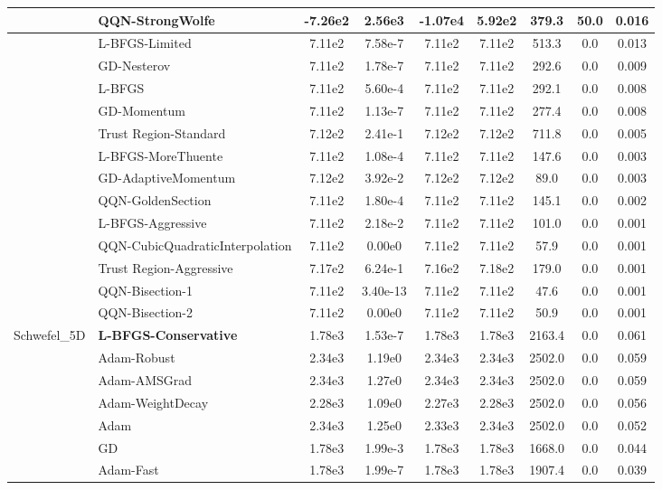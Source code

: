 \documentclass[10pt]{article}
\begin{document}
\begin{longtable}{|l|l|c|c|c|c|c|c|c|}
\hline
 & QQN-StrongWolfe & -7.26e2 & 2.56e3 & -1.07e4 & 5.92e2 & 379.3 & 50.0 & 0.016 \\
\hline
 & L-BFGS-Limited & 7.11e2 & 7.58e-7 & 7.11e2 & 7.11e2 & 513.3 & 0.0 & 0.013 \\
\hline
 & GD-Nesterov & 7.11e2 & 1.78e-7 & 7.11e2 & 7.11e2 & 292.6 & 0.0 & 0.009 \\
\hline
 & L-BFGS & 7.11e2 & 5.60e-4 & 7.11e2 & 7.11e2 & 292.1 & 0.0 & 0.008 \\
\hline
 & GD-Momentum & 7.11e2 & 1.13e-7 & 7.11e2 & 7.11e2 & 277.4 & 0.0 & 0.008 \\
\hline
 & Trust Region-Standard & 7.12e2 & 2.41e-1 & 7.12e2 & 7.12e2 & 711.8 & 0.0 & 0.005 \\
\hline
 & L-BFGS-MoreThuente & 7.11e2 & 1.08e-4 & 7.11e2 & 7.11e2 & 147.6 & 0.0 & 0.003 \\
\hline
 & GD-AdaptiveMomentum & 7.12e2 & 3.92e-2 & 7.12e2 & 7.12e2 & 89.0 & 0.0 & 0.003 \\
\hline
 & QQN-GoldenSection & 7.11e2 & 1.80e-4 & 7.11e2 & 7.11e2 & 145.1 & 0.0 & 0.002 \\
\hline
 & L-BFGS-Aggressive & 7.11e2 & 2.18e-2 & 7.11e2 & 7.11e2 & 101.0 & 0.0 & 0.001 \\
\hline
 & QQN-CubicQuadraticInterpolation & 7.11e2 & 0.00e0 & 7.11e2 & 7.11e2 & 57.9 & 0.0 & 0.001 \\
\hline
 & Trust Region-Aggressive & 7.17e2 & 6.24e-1 & 7.16e2 & 7.18e2 & 179.0 & 0.0 & 0.001 \\
\hline
 & QQN-Bisection-1 & 7.11e2 & 3.40e-13 & 7.11e2 & 7.11e2 & 47.6 & 0.0 & 0.001 \\
\hline
 & QQN-Bisection-2 & 7.11e2 & 0.00e0 & 7.11e2 & 7.11e2 & 50.9 & 0.0 & 0.001 \\
Schwefel\_5D & \textbf{L-BFGS-Conservative} & 1.78e3 & 1.53e-7 & 1.78e3 & 1.78e3 & 2163.4 & 0.0 & 0.061 \\
\hline
 & Adam-Robust & 2.34e3 & 1.19e0 & 2.34e3 & 2.34e3 & 2502.0 & 0.0 & 0.059 \\
\hline
 & Adam-AMSGrad & 2.34e3 & 1.27e0 & 2.34e3 & 2.34e3 & 2502.0 & 0.0 & 0.059 \\
\hline
 & Adam-WeightDecay & 2.28e3 & 1.09e0 & 2.27e3 & 2.28e3 & 2502.0 & 0.0 & 0.056 \\
\hline
 & Adam & 2.34e3 & 1.25e0 & 2.33e3 & 2.34e3 & 2502.0 & 0.0 & 0.052 \\
\hline
 & GD & 1.78e3 & 1.99e-3 & 1.78e3 & 1.78e3 & 1668.0 & 0.0 & 0.044 \\
\hline
 & Adam-Fast & 1.78e3 & 1.99e-7 & 1.78e3 & 1.78e3 & 1907.4 & 0.0 & 0.039 \\

\end{longtable}
\end{document}
